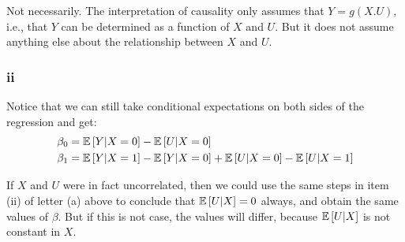 \documentclass[12pt]{paper}
\begin{document}
Not necessarily. The interpretation of causality only assumes that $Y=g(X.U)$, i.e., that $Y$ can be determined as a function of $X$ and $U$. But it does not assume anything else about the relationship between $X$ and $U$.

\subsubsection*{ii}

Notice that we can still take conditional expectations on both sides of the regression and get:
\begin{equation}
\begin{split}
\beta_0&=\mathbb{E} \left [ Y|X=0 \right ]-\mathbb{E} \left [ U|X=0 \right ]\\
\beta_1&=\mathbb{E} \left [ Y|X=1 \right ]-\mathbb{E} \left [ Y|X=0 \right ]+\mathbb{E} \left [ U|X=0 \right ]-\mathbb{E} \left [ U|X=1 \right ]\\
\end{split}
\end{equation}

If $X$ and $U$ were in fact uncorrelated, then we could use the same steps in item (ii) of letter (a) above to conclude that $\mathbb{E} \left [ U|X \right ]=0$ always, and obtain the same values of $\beta$. But if this is not case, the values will differ, because $\mathbb{E} \left [ U|X \right ]$ is not constant in $X$.
\end{document}
